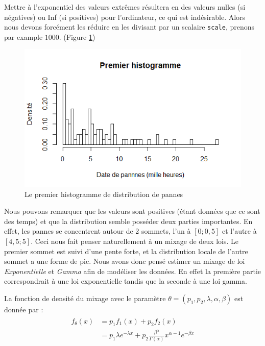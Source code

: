 \documentclass[10pt,a4paper]{article}
\begin{document}
Mettre à l'exponentiel des valeurs extrêmes résultera en des valeurs nulles (si négatives) ou Inf (si positives) pour l'ordinateur, ce qui est indésirable. Alors nous devons forcément les réduire en les divisant par un scalaire \texttt{scale}, prenons par example $1000$.  (Figure \ref{histo1})
\begin{figure}[!htb]
    \centering
    \includegraphics[width=\textwidth]{img/premier_histo.png}
    \caption{Le premier histogramme de distribution de pannes}
    \label{histo1}
\end{figure}



Nous pouvons remarquer que les valeurs sont positives (étant données que ce sont des temps) et que la
distribution semble posséder deux parties importantes. En effet, les pannes se concentrent autour de 2 sommets, l'un à $[0; 0,5]$ et l'autre à $[4,5; 5]$. Ceci nous fait penser naturellement à un mixage de deux lois. Le premier sommet est suivi d'une pente forte, et la distribution locale de l'autre sommet a une forme de pic.
Nous avons donc pensé estimer un mixage de loi \emph{Exponentielle} et \emph{Gamma} afin de modéliser
les données. En effet la première partie correspondrait à une loi exponentielle tandis que la seconde à
une loi gamma.

La fonction de densité du mixage avec le paramètre $\theta  = \left( {p_1, p_2, \lambda ,\alpha ,\beta } \right)$ est donnée par :
\begin{align}
    \begin{split}
        \label{fMelExpGam}
        {f_\theta }\left( x \right) & = {p_1}{f_1}\left( x \right) + {p_2}{f_2}\left( x \right) \\
        & = {p_1}\lambda {e^{ - \lambda x}} + {p_2}\frac{{{\beta ^\alpha }}}{{\Gamma \left( \alpha  \right)}}{x^{\alpha  - 1}}{e^{ - \beta x}}
    \end{split}
\end{align}
\end{document}

